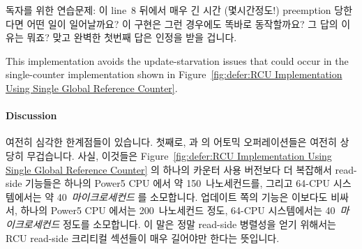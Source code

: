 {	독자를 위한 연습문제:  이 line~8 뒤에서 매우 긴
	시간 (몇시간정도!) preemption 당한다면 어떤 일이 일어날까요?
	이 구현은 그런 경우에도 똑바로 동작할까요?
	그 답의 이유는 뭐죠?
	맞고 완벽한 첫번째 답은 인정을 받을 겁니다.
	\iffalse

	Exercise for the reader: What happens if \co{rcu_read_lock()}
	is preempted for a very long time (hours!) just after
	line~8?
	Does this implementation operate correctly in that case?
	Why or why not?
	The first correct and complete response will be credited.
	\fi
} \QuickQuizEnd
\iffalse

이 구현은
Figure~\ref{fig:defer:RCU Implementation Using Single Global Reference Counter}
에서 보인 단일 카운터 구현에서 일어날 수 있는
업데이트 쪽의 starvation 문제를 배제합니다.
\fi

This implementation avoids the update-starvation issues that could
occur in the single-counter implementation shown in
Figure~\ref{fig:defer:RCU Implementation Using Single Global Reference Counter}.

\paragraph{Discussion}

여전히 심각한 한계점들이 있습니다.
첫째로,  과  의 어토믹 오퍼레이션들은
여전히 상당히 무겁습니다.
사실, 이것들은
Figure~\ref{fig:defer:RCU Implementation Using Single Global Reference Counter}
의 하나의 카운터 사용 버전보다 더 복잡해서 read-side 기능들은 하나의 Power5 CPU
에서 약 150~나노세컨드를, 그리고 64-CPU 시스템에서는 약
40~\emph{마이크로세컨드} 를 소모합니다.
업데이트 쪽의  기능은 이보다도 비싸서, 하나의 Power5 CPU
에서는 200~나노세컨드 정도, 64-CPU 시스템에서는 40~\emph{마이크로세컨드} 정도를
소모합니다.
이 말은 정말 read-side 병렬성을 얻기 위해서는 RCU read-side 크리티컬 섹션들이
매우 길어야만 한다는 뜻입니다.
\iffalse

There are still some serious shortcomings.
First, the atomic operations in \co{rcu_read_lock()}
and \co{rcu_read_unlock()}
are still quite heavyweight.
In fact, they are more complex than those
of the single-counter variant shown in
Figure~\ref{fig:defer:RCU Implementation Using Single Global Reference Counter},
with the read-side primitives consuming about 150~nanoseconds on a single
Power5 CPU and almost 40~\emph{microseconds} on a 64-CPU system.
The update-side \co{synchronize_rcu()} primitive is more costly as
well, ranging from about 200~nanoseconds on a single Power5 CPU to
more than 40~\emph{microseconds} on a 64-CPU system.
This means that the RCU read-side critical sections
have to be extremely long in order to get any real
read-side parallelism.
\fi

